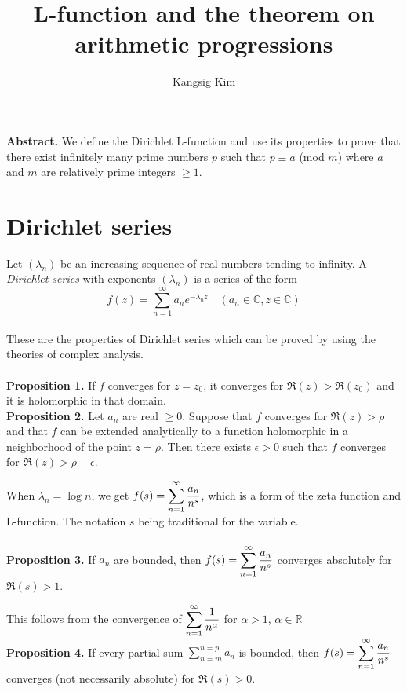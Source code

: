 \documentclass[11pt]{article}
\title{L-function and the theorem on arithmetic progressions}
\author{Kangsig Kim}
\begin{document}
\maketitle
\textbf{Abstract.} We define the Dirichlet L-function and use its properties to prove that there exist infinitely many prime numbers $p$ such that $p\equiv a$ (mod $m$) where $a$ and $m$ are relatively prime integers $\geq1$.
\vspace{10mm}

\section{Dirichlet series}
Let $(\lambda_n)$ be an increasing sequence of real numbers tending to infinity. A \textit{Dirichlet series} with exponents $(\lambda_n)$ is a series of the form
\begin{equation*}
    f(z)=\displaystyle\sum_{n=1}^{\infty} a_n e^{-\lambda_n z} \quad (a_n\in \mathbb{C}, z\in \mathbb{C})
\end{equation*}
\\
These are the properties of Dirichlet series which can be proved by using the theories of complex analysis.
\\
\\
\textbf{Proposition 1.}
If $f$ converges for $z=z_0$, it converges for $\Re(z)>\Re(z_0)$ and it is holomorphic in that domain.
\vspace{7mm}
\\
\textbf{Proposition 2.}
Let $a_n$ are real $\geq0$. Suppose that $f$ converges for $\Re(z)>\rho$ and that $f$ can be extended analytically to a function holomorphic in a neighborhood of the point $z=\rho$. Then there exists $\epsilon>0$ such that $f$ converges for $\Re(z)>\rho-\epsilon$.
\vspace{8mm}

When $\lambda_n=\log n$, we get $f(s)=\displaystyle\sum_{n=1}^{\infty} {a_n\over n^s}$, which is a form of the zeta function and L-function. The notation $s$ being traditional for the variable.
\\
\\
\textbf{Proposition 3.}
If $a_n$ are bounded, then $f(s)=\displaystyle\sum_{n=1}^{\infty} {a_n\over n^s}$ converges absolutely for $\Re(s)>1$.
\par
This follows from the convergence of $\displaystyle\sum_{n=1}^{\infty} {1\over n^\alpha}$ for $\alpha>1$, $\alpha\in\mathbb{R}$
\vspace{3mm}
\\
\textbf{Proposition 4.}
If every partial sum $\displaystyle\sum_{n=m}^{n=p} a_n$ is bounded, then $f(s)=\displaystyle\sum_{n=1}^{\infty} {a_n\over n^s}$ converges (not necessarily absolute) for $\Re(s)>0$.
\vspace{10mm}
\end{document}
